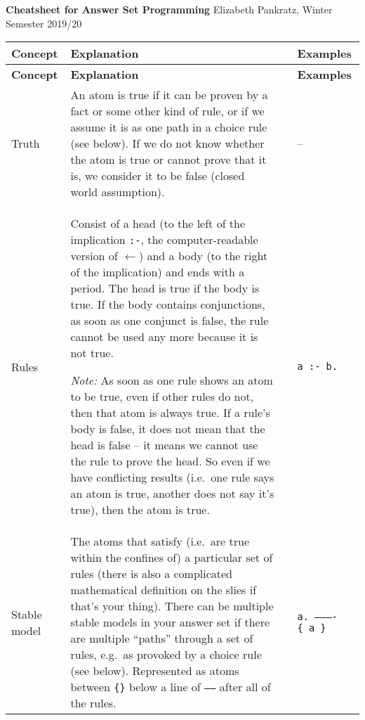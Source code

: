 \documentclass[10pt,a4paper,landscape]{article}
\begin{document}
	
\noindent
\textbf{Cheatsheet for Answer Set Programming} \hfill Elizabeth Pankratz, Winter Semester 2019/20
	
\begin{longtable}{p{3cm}p{13.5cm}lp{4cm}p{4cm}}
	
\toprule
\textbf{Concept} & \textbf{Explanation} && \multicolumn{2}{l}{\textbf{Examples}}\\ \midrule
\endfirsthead

\toprule
\textbf{Concept} & \textbf{Explanation} && \multicolumn{2}{l}{\textbf{Examples}}\\ \midrule
\endhead

\hline
\endfoot

\bottomrule
\endlastfoot
	
	
	Truth
		& An atom is true if it can be proven by a fact or some other kind of rule, or if we assume it is as one path in a choice rule (see below).
		If we do not know whether the atom is true or cannot prove that it is, we consider it to be false (closed world assumption). 
		&& -- &\\ \midrule
	
	Rules
		& Consist of a head (to the left of the implication \texttt{:-}, the computer-readable version of $\leftarrow$) and a body (to the right of the implication) and ends with a period.
		The head is true if the body is true.
		If the body contains conjunctions, as soon as one conjunct is false, the rule cannot be used any more because it is not true. \newline
		
		\textit{Note:} As soon as one rule shows an atom to be true, even if other rules do not, then that atom is always true. 
		If a rule's body is false, it does not mean that the head is false -- it means we cannot use the rule to prove the head.
		So even if we have conflicting results (i.e.\ one rule says an atom is true, another does not say it's true), then the atom is true.
		&& \texttt{a :- b.} &\\ \midrule
		
	Stable model
		& The atoms that satisfy (i.e.\ are true within the confines of) a particular set of rules (there is also a complicated mathematical definition on the slies if that's your thing).
		There can be multiple stable models in your answer set if there are multiple ``paths'' through a set of rules, e.g.\ as provoked by a choice rule (see below).
		Represented as atoms between \texttt{\{\}} below a line of \texttt{-----} after all of the rules.
		&& \texttt{a. \newline
				---------- \newline
				\{ a \}} &\\ \midrule
	

\end{longtable}
\end{document}
